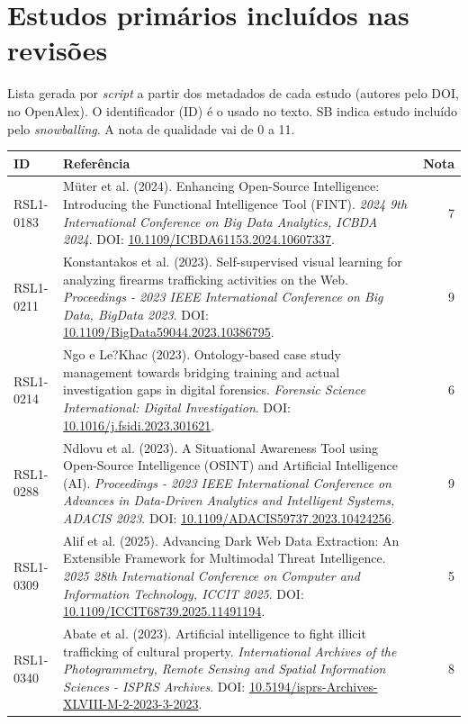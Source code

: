 \chapter{Estudos primários incluídos nas revisões}
\label{ap:estudos}

Lista gerada por \textit{script} a partir dos metadados de cada estudo (autores pelo DOI, no OpenAlex). O identificador (ID) é o usado no texto. SB indica estudo incluído pelo \textit{snowballing}. A nota de qualidade vai de 0 a 11.

\begin{small}
\begin{longtable}{lp{11.2cm}r}
\hline
\textbf{ID} & \textbf{Referência} & \textbf{Nota} \\ \hline\endhead
RSL1-0183 & Müter et al. (2024). Enhancing Open-Source Intelligence: Introducing the Functional Intelligence Tool (FINT). \textit{2024 9th International Conference on Big Data Analytics, ICBDA 2024}. DOI: \url{10.1109/ICBDA61153.2024.10607337}. & 7 \\
RSL1-0211 & Konstantakos et al. (2023). Self-supervised visual learning for analyzing firearms trafficking activities on the Web. \textit{Proceedings - 2023 IEEE International Conference on Big Data, BigData 2023}. DOI: \url{10.1109/BigData59044.2023.10386795}. & 9 \\
RSL1-0214 & Ngo e Le?Khac (2023). Ontology-based case study management towards bridging training and actual investigation gaps in digital forensics. \textit{Forensic Science International: Digital Investigation}. DOI: \url{10.1016/j.fsidi.2023.301621}. & 6 \\
RSL1-0288 & Ndlovu et al. (2023). A Situational Awareness Tool using Open-Source Intelligence (OSINT) and Artificial Intelligence (AI). \textit{Proceedings - 2023 IEEE International Conference on Advances in Data-Driven Analytics and Intelligent Systems, ADACIS 2023}. DOI: \url{10.1109/ADACIS59737.2023.10424256}. & 9 \\
RSL1-0309 & Alif et al. (2025). Advancing Dark Web Data Extraction: An Extensible Framework for Multimodal Threat Intelligence. \textit{2025 28th International Conference on Computer and Information Technology, ICCIT 2025}. DOI: \url{10.1109/ICCIT68739.2025.11491194}. & 5 \\
RSL1-0340 & Abate et al. (2023). Artificial intelligence to fight illicit trafficking of cultural property. \textit{International Archives of the Photogrammetry, Remote Sensing and Spatial Information Sciences - ISPRS Archives}. DOI: \url{10.5194/isprs-Archives-XLVIII-M-2-2023-3-2023}. & 8 \\

\end{longtable}
\end{small}
